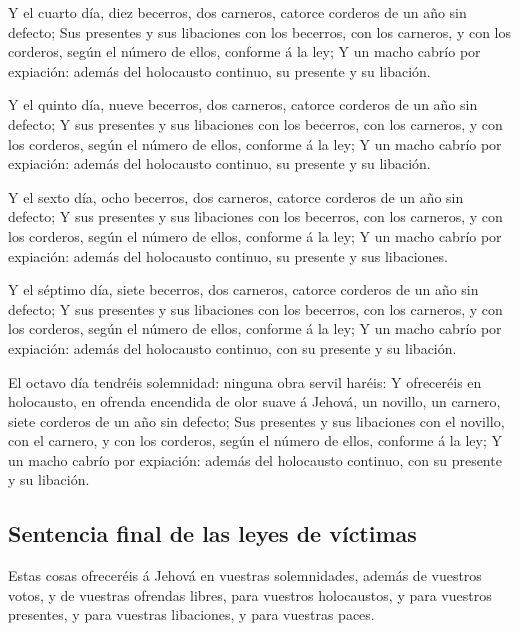  Y el cuarto día, diez becerros, dos carneros, catorce
corderos de un año sin defecto;  Sus presentes y sus
libaciones con los becerros, con los carneros, y con los corderos, según
el número de ellos, conforme á la ley;  Y un macho cabrío
por expiación: además del holocausto continuo, su presente y su
libación.

 Y el quinto día, nueve becerros, dos carneros, catorce
corderos de un año sin defecto;  Y sus presentes y sus
libaciones con los becerros, con los carneros, y con los corderos, según
el número de ellos, conforme á la ley;  Y un macho cabrío
por expiación: además del holocausto continuo, su presente y su
libación.

 Y el sexto día, ocho becerros, dos carneros, catorce
corderos de un año sin defecto;  Y sus presentes y sus
libaciones con los becerros, con los carneros, y con los corderos, según
el número de ellos, conforme á la ley;  Y un macho cabrío
por expiación: además del holocausto continuo, su presente y sus
libaciones.

 Y el séptimo día, siete becerros, dos carneros, catorce
corderos de un año sin defecto;  Y sus presentes y sus
libaciones con los becerros, con los carneros, y con los corderos, según
el número de ellos, conforme á la ley;  Y un macho cabrío
por expiación: además del holocausto continuo, con su presente y su
libación.

 El octavo día tendréis solemnidad: ninguna obra servil
haréis:  Y ofreceréis en holocausto, en ofrenda encendida
de olor suave á Jehová, un novillo, un carnero, siete corderos de un año
sin defecto;  Sus presentes y sus libaciones con el
novillo, con el carnero, y con los corderos, según el número de ellos,
conforme á la ley;  Y un macho cabrío por expiación:
además del holocausto continuo, con su presente y su libación.

\hypertarget{sentencia-final-de-las-leyes-de-vuxedctimas}{%
\subsection{Sentencia final de las leyes de
víctimas}\label{sentencia-final-de-las-leyes-de-vuxedctimas}}

 Estas cosas ofreceréis á Jehová en vuestras
solemnidades, además de vuestros votos, y de vuestras ofrendas libres,
para vuestros holocaustos, y para vuestros presentes, y para vuestras
libaciones, y para vuestras paces.

